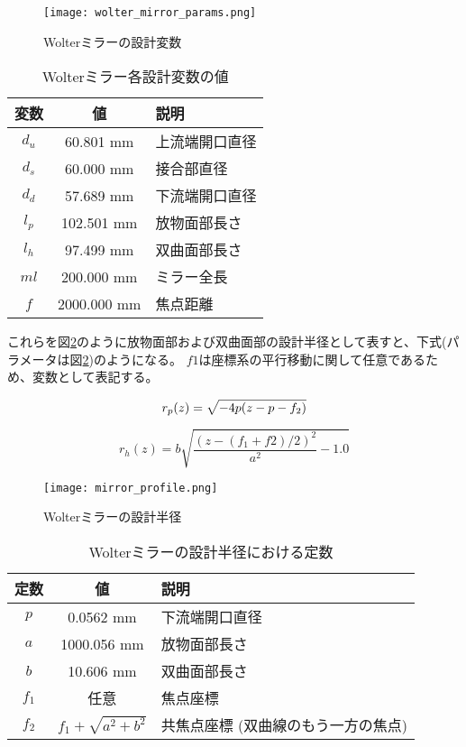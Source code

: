 \begin{figure}[h!]
\centering
\texttt{[image: wolter\_mirror\_params.png]}
\caption{Wolterミラーの設計変数}
\label{fig:wolter_params}
\end{figure}

\begin{table}[ht]
\begin{center}
  \begin{tabular}{|c|c|l|} \hline
    変数 & 値 & 説明 \\ \hline
    $d_u$ & 60.801 mm & 上流端開口直径 \\
    $d_s$ & 60.000 mm & 接合部直径 \\
    $d_d$ & 57.689 mm & 下流端開口直径 \\
    $l_p$ & 102.501 mm & 放物面部長さ \\
    $l_h$ & 97.499 mm & 双曲面部長さ \\
    $ml$ & 200.000 mm & ミラー全長 \\
    $f$ & 2000.000 mm & 焦点距離 \\ \hline
  \end{tabular}
  \caption{Wolterミラー各設計変数の値}
  \label{tb:wolter_params}
\end{center}
\end{table}

これらを図\ref{fig:wolter_profile}のように放物面部および双曲面部の設計半径として表すと、下式(パラメータは図\ref{tb:wolter_profile_constants})のようになる。
$f1$は座標系の平行移動に関して任意であるため、変数として表記する。

\begin{equation}
    r_p(z) = \sqrt{ -4p(z - p - f_2) } \\
\end{equation}

\begin{equation}
    r_h(z) = b \sqrt{ \frac{(z - (f_1 + f2) / 2)^2}{a^2} - 1.0 }
\end{equation}

\begin{figure}[h]
\centering
\texttt{[image: mirror\_profile.png]}
\caption{Wolterミラーの設計半径}
\label{fig:wolter_profile}
\end{figure}

\begin{table}[htb]
    \begin{center}
      \begin{tabular}{|c|c|l|} \hline
        定数 & 値 & 説明 \\ \hline
        $p$ & 0.0562 mm & 下流端開口直径 \\
        $a$ & 1000.056 mm & 放物面部長さ \\
        $b$ & 10.606 mm & 双曲面部長さ \\ 
        $f_1$ & 任意 & 焦点座標 \\
        $f_2$ & $f_1 + \sqrt{ a^2 + b^2 }$  & 共焦点座標 (双曲線のもう一方の焦点) \\\hline
      \end{tabular}
      \caption{Wolterミラーの設計半径における定数}
      \label{tb:wolter_profile_constants}
    \end{center}
\end{table}

